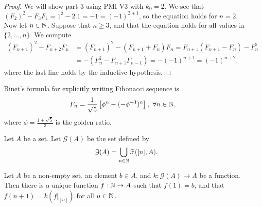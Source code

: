 \documentclass[a4paper,english,12pt]{article}
\begin{document}
\begin{proof} We will show part 3 using PMI-V3 with $k_0=2$. We see that $(F_2)^2-F_3F_1=1^2-2.1=-1=(-1)^{2+1}$, so the equation holds for $n=2$. Now let $n\in \mathbb{N}$. Suppose that $n \geq 3$, and that the equation holds for all values in $\{2, . . ., n\}$. We compute 
\begin{align*}
(F_{n+1})^2 - F_{n+2}F_n&=(F_{n+1})^2 - (F_{n+1}+F_n)F_n = F_{n+1}(F_{n+1}-F_n) - F_n^2\\
&= -(F_{n}^2-F_{n+1}F_{n-1}) = - (-1)^{n+1} = (-1)^{n+2}.
\end{align*} 
where the last line holds by the inductive hypothesis.
\end{proof}
\begin{rem} Binet's formula for explicitly writing Fibonacci sequence is 
\begin{align*}
F_n %
&=\frac{1}{\sqrt{5}}\left[\phi^n - (-\phi^{-1})^n \right], ~\forall n \in \N,
\end{align*}
where $\phi = \frac{1 + \sqrt{5}}{2}$ is the golden ratio.
\end{rem}
\begin{defn} Let $A$ be a set. Let $\mathcal{G}(A)$ be the set defined by
\begin{align*}
\mathcal{G}(A)=\bigcup_{n \in \mathbb{N}}\mathcal{F}([n], A).
\end{align*}
\end{defn}
\begin{thm} Let $A$ be a non-empty set, an element $b \in A$, and $k: \mathcal{G}(A) \to A$ be a function. Then there is a unique function $f: \mathbb{N} \to A$ such that $f(1)=b$, and that $f(n + 1) = k(f|_{[n]})$ for all $n \in \mathbb{N}$.
\end{thm}
\end{document}
